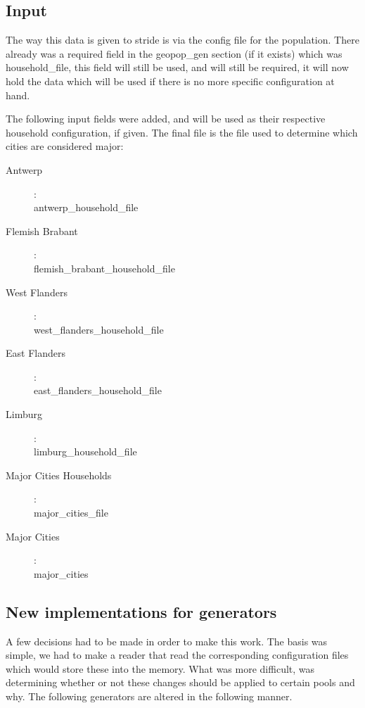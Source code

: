 \subsection{Input}
The way this data is given to stride is via the config file for the population. There already was a required field in the geopop\_gen section (if it exists) which was household\_file, this field will still be used, and will still be required, it will now hold the data which will be used if there is no more specific configuration at hand.

The following input fields were added, and will be used as their respective household configuration, if given. The final file is the file used to determine which cities are considered major:

\begin{description}
	\item[Antwerp]: \\ 
		antwerp\_household\_file 
	\item[Flemish Brabant]: \\
		flemish\_brabant\_household\_file
	\item[West Flanders]: \\
		west\_flanders\_household\_file
	\item[East Flanders]: \\
		east\_flanders\_household\_file
	\item[Limburg]: \\
		limburg\_household\_file
	\item[Major Cities Households]: \\
		major\_cities\_file 
	\item[Major Cities]: \\
		major\_cities
\end{description}

\subsection{New implementations for generators}
A few decisions had to be made in order to make this work. The basis was simple, we had to make a reader that read the corresponding configuration files which would store these into the memory. What was more difficult, was determining whether or not these changes should be applied to certain pools and why. The following generators are altered in the following manner.

